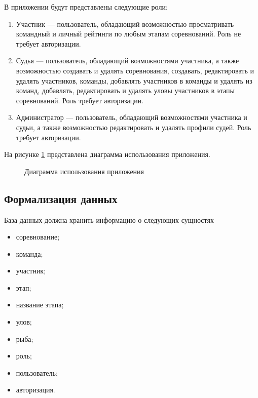 В приложении будут представлены следующие роли:
\begin{enumerate}
	\item Участник --- пользователь, обладающий возможностью просматривать командный и личный рейтинги по любым этапам соревнований. Роль не требует авторизации.
	\item Судья --- пользователь, обладающий возможностями участника, а также возможностью создавать и удалять соревнования, создавать, редактировать и удалять участников, команды, добавлять участников в команды и удалять из команд, добавлять, редактировать и удалять уловы участников в этапы соревнований. Роль требует авторизации.
	\item Администратор ---  пользователь, обладающий возможностями участника и судьи, а также возможностью редактировать и удалять профили судей. Роль требует авторизации.
\end{enumerate}

На рисунке \ref{fig:UseCase} представлена диаграмма использования приложения.

\begin{figure}[h!]
	\caption{Диаграмма использования приложения}
	\label{fig:UseCase}
\end{figure}

\subsection{Формализация данных}

База данных должна хранить информацию о следующих сущностях 

\begin{itemize}[label=---]
	\item соревнование;
	\item команда;
	\item участник;
	\item этап;
	\item название этапа;
	\item улов;
	\item рыба;
	\item роль;
	\item пользователь;
	\item авторизация.
\end{itemize}

